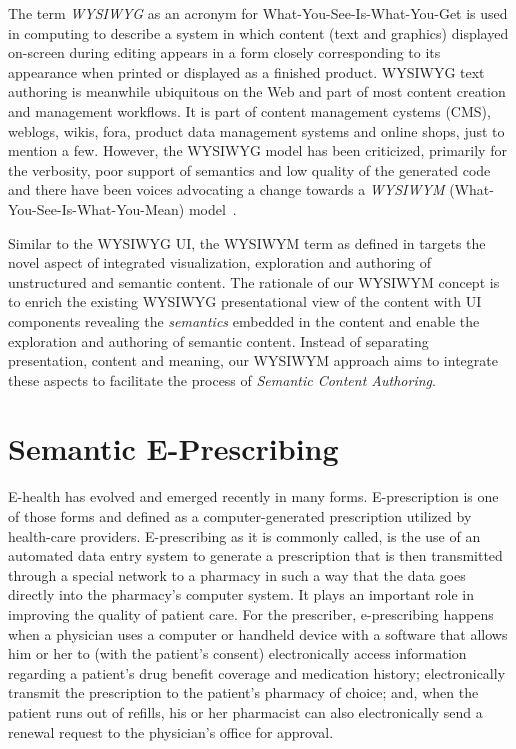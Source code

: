 \documentclass[journal]{IEEEtran}
\begin{document}
The term \emph{WYSIWYG} as an acronym for What-You-See-Is-What-You-Get is used in computing to describe a system in which content (text and graphics) displayed on-screen during editing appears in a form closely corresponding to its appearance when printed or displayed as a finished product.
WYSIWYG text authoring is meanwhile ubiquitous on the Web and part of most content creation and management workflows.
It is part of content management cystems (CMS), weblogs, wikis, fora, product data management systems and online shops, just to mention a few.
However, the WYSIWYG model has been criticized, primarily for the verbosity, poor support of semantics and low quality of the generated code and there have been voices advocating a change towards a \emph{WYSIWYM} (What-You-See-Is-What-You-Mean) model~\cite{Spiesser2004,Sauer2006}.

Similar to the WYSIWYG UI, the WYSIWYM term as defined in \cite{khaliliWISE2013} targets the novel aspect of integrated visualization, exploration and authoring of unstructured and semantic content.
The rationale of our WYSIWYM concept is to enrich the existing WYSIWYG presentational view of the content with UI components revealing the \emph{semantics} embedded in the content and enable the exploration and authoring of semantic content.
Instead of separating presentation, content and meaning, our WYSIWYM approach aims to integrate these aspects to facilitate the process of \emph{Semantic Content Authoring}.

\section{Semantic E-Prescribing}
\label{sec:sep}

E-health has evolved and emerged recently in many forms.
E-prescription is one of those forms and defined as a computer-generated prescription utilized by health-care providers.
E-prescribing as it is commonly called, is the use of an automated data entry system to generate a prescription that is then transmitted through a special network to a pharmacy in such a way that the data goes directly into the pharmacy’s computer system.
It plays an important role in improving the quality of patient care.
For the prescriber, e-prescribing happens when a physician uses a computer or handheld device with a software that allows him or her to (with the patient’s consent) electronically access information regarding a patient’s drug benefit coverage and medication history; electronically transmit the prescription to the patient’s pharmacy of choice; and, when the patient runs out of refills, his or her pharmacist can also electronically send a renewal request to the physician’s office for approval.
\end{document}
